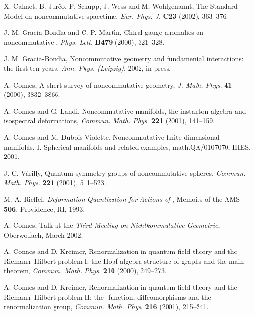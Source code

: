 \documentclass[a4paper,12pt]{article}
\providecommand{\R}{\mathbb{R}}         %
\providecommand{\1}{\mathbf{1}}         %
\providecommand{\7}{\dagger}            %
\providecommand{\8}{\bullet}            %
\renewcommand{\.}{\cdot}            %
\renewcommand{\:}{\colon}           %
\begin{document}
\begin{thebibliography}{74}
X. Calmet, B. Jur\v{c}o, P. Schupp, J. Wess and M. Wohlgenannt,
The Standard Model on noncommutative spacetime,
\textit{Eur. Phys. J}. {\bf C23} (2002), 363--376.

J. M. Gracia-Bond\'{\i}a and C. P. Mart\'{\i}n,
Chiral gauge anomalies on noncommutative \myHighlight{$\R^4$}\coordHE{},
\textit{Phys. Lett}. {\bf B479} (2000), 321--328.

J. M. Gracia-Bond\'{\i}a,
Noncommutative geometry and fundamental interactions: the first
ten years,
\textit{Ann. Phys. (Leipzig)}, 2002, in press.

A. Connes,
A short survey of noncommutative geometry,
\textit{J. Math. Phys}. {\bf 41} (2000), 3832--3866.

A. Connes and G. Landi,
Noncommutative manifolds, the instanton algebra and isospectral
deformations,
\textit{Commun. Math. Phys}. {\bf 221} (2001), 141--159.

A. Connes and M. Dubois-Violette,
Noncommutative finite-dimensional manifolds. I. Spherical manifolds
and related examples,
math.QA/0107070, IHES, 2001.

J. C. V\'arilly,
Quantum symmetry groups of noncommutative spheres,
\textit{Commun. Math. Phys}. {\bf 221} (2001), 511--523.

M. A. Rieffel,
\textit{Deformation Quantization for Actions of \myHighlight{$\R^d$}\coordHE{}},
Memoirs of the AMS {\bf 506}, Providence, RI, 1993.

A. Connes,
Talk at the \textit{Third Meeting on Nichtkommutative Geometrie},
Oberwolfach, March 2002.

A. Connes and D. Kreimer,
Renormalization in quantum field theory and the Riemann--Hilbert
problem I: the Hopf algebra structure of graphs and the main
theorem,
\textit{Commun. Math. Phys}. {\bf 210} (2000), 249--273.

A. Connes and D. Kreimer,
Renormalization in quantum field theory and the Riemann--Hilbert
problem II: the \myHighlight{$\beta$}\coordHE{}-function, diffeomorphisms and the
renormalization group,
\textit{Commun. Math. Phys}. {\bf 216} (2001), 215--241.


\end{thebibliography}
\end{document}
